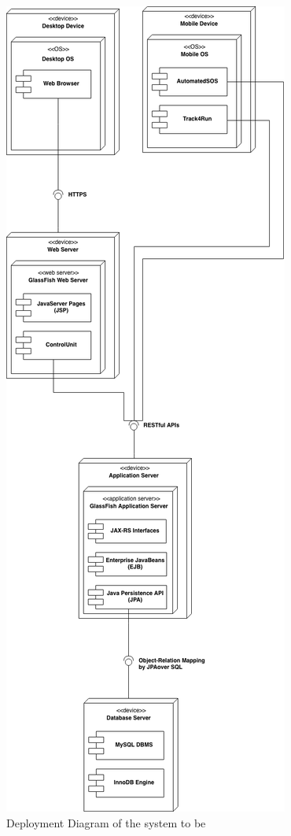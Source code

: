 \begin{figure}[H]
  \begin{center}
  	\includegraphics[height=0.59\paperheight]{./img/Deployment_Diagram.png}
    \hspace{0.05\linewidth}
    \centering
    \caption{Deployment Diagram of the system to be}
		\label{img:Deployment_Diagram}
    \end{center}
\end{figure}

